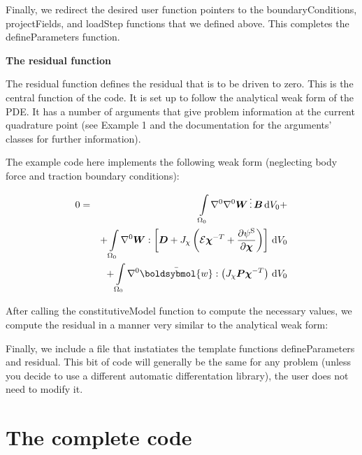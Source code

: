 \begin{DoxyCodeInclude}

\end{DoxyCodeInclude}


Finally, we redirect the desired user function pointers to the {\ttfamily boundary\-Conditions}, {\ttfamily project\-Fields}, and {\ttfamily load\-Step} functions that we defined above. This completes the {\ttfamily define\-Parameters} function.


\begin{DoxyCodeInclude}

\end{DoxyCodeInclude}


{\bfseries  The {\ttfamily residual} function }

The residual function defines the residual that is to be driven to zero. This is the central function of the code. It is set up to follow the analytical weak form of the P\-D\-E. It has a number of arguments that give problem information at the current quadrature point (see Example 1 and the documentation for the arguments' classes for further information).

The example code here implements the following weak form (neglecting body force and traction boundary conditions)\-:

\begin{eqnarray*} 0 &=& \int \limits_{{\Omega}_0} \nabla^0\nabla^0\boldsymbol{W}\,\vdots\,\boldsymbol{B} \,\mathrm{d}V_0+\\ &\phantom{=}& +\int \limits_{{\Omega}_0} \nabla^0\boldsymbol{W}:\left[\boldsymbol{D}+J_\chi\left(\mathcal{E} \boldsymbol{\chi}^{-T} + \frac{\partial \psi^\mathrm{S}}{\partial \boldsymbol{\chi}} \right) \right] \, \mathrm{d}V_0\\ &\phantom{=}& + \int \limits_{{\Omega}_0} \nabla^0\bar{\boldsybmol{w}}:\left(J_\chi\boldsymbol{P} \boldsymbol{\chi}^{-T} \right) \, \mathrm{d}V_0 \end{eqnarray*}

After calling the {\ttfamily constitutive\-Model} function to compute the necessary values, we compute the residual in a manner very similar to the analytical weak form\-:


\begin{DoxyCodeInclude}

\end{DoxyCodeInclude}


Finally, we include a file that instatiates the template functions {\ttfamily define\-Parameters} and {\ttfamily residual}. This bit of code will generally be the same for any problem (unless you decide to use a different automatic differentation library), the user does not need to modify it.


\begin{DoxyCodeInclude}

\end{DoxyCodeInclude}


\section*{The complete code }


\begin{DoxyCodeInclude}
\end{DoxyCodeInclude}
 